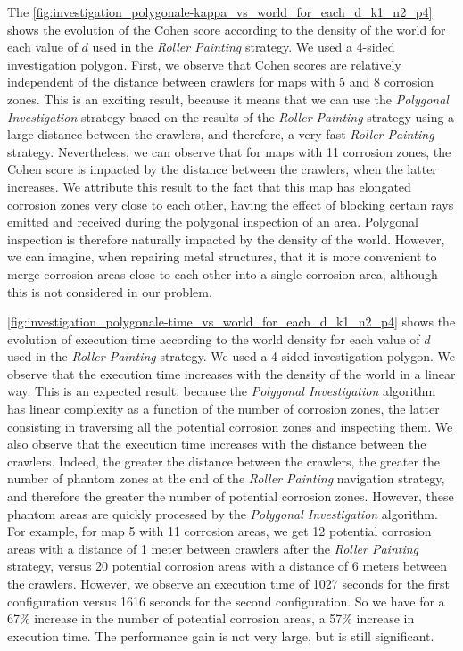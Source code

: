 The \ref{fig:investigation_polygonale-kappa_vs_world_for_each_d_k1_n2_p4} shows the evolution of the Cohen score according to the density of the world for each value of $d$ used in the \textit{Roller Painting} strategy.
We used a 4-sided investigation polygon.
First, we observe that Cohen scores are relatively independent of the distance between crawlers for maps with 5 and 8 corrosion zones.
This is an exciting result, because it means that we can use the \textit{Polygonal Investigation} strategy based on the results of the \textit{Roller Painting} strategy using a large distance between the crawlers, and therefore, a very fast \textit{Roller Painting} strategy.
Nevertheless, we can observe that for maps with 11 corrosion zones, the Cohen score is impacted by the distance between the crawlers, when the latter increases.
We attribute this result to the fact that this map has elongated corrosion zones very close to each other, having the effect of blocking certain rays emitted and received during the polygonal inspection of an area.
Polygonal inspection is therefore naturally impacted by the density of the world.
However, we can imagine, when repairing metal structures, that it is more convenient to merge corrosion areas close to each other into a single corrosion area, although this is not considered in our problem.

\ref{fig:investigation_polygonale-time_vs_world_for_each_d_k1_n2_p4} shows the evolution of execution time according to the world density for each value of $d$ used in the \textit{Roller Painting} strategy.
We used a 4-sided investigation polygon.
We observe that the execution time increases with the density of the world in a linear way.
This is an expected result, because the \textit{Polygonal Investigation} algorithm has linear complexity as a function of the number of corrosion zones, the latter consisting in traversing all the potential corrosion zones and inspecting them.
We also observe that the execution time increases with the distance between the crawlers.
Indeed, the greater the distance between the crawlers, the greater the number of phantom zones at the end of the \textit{Roller Painting} navigation strategy, and therefore the greater the number of potential corrosion zones.
However, these phantom areas are quickly processed by the \textit{Polygonal Investigation} algorithm.
For example, for map 5 with 11 corrosion areas, we get 12 potential corrosion areas with a distance of 1 meter between crawlers after the \textit{Roller Painting} strategy, versus 20 potential corrosion areas with a distance of 6 meters between the crawlers.
However, we observe an execution time of 1027 seconds for the first configuration versus 1616 seconds for the second configuration.
So we have for a 67\% increase in the number of potential corrosion areas, a 57\% increase in execution time.
The performance gain is not very large, but is still significant.

